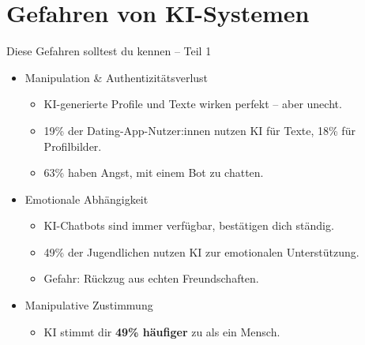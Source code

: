 \documentclass[10pt,aspectratio=169]{beamer}
\begin{document}
	\section{Gefahren von KI-Systemen}
	\begin{frame}{Diese Gefahren solltest du kennen – Teil 1}
		\begin{itemize}
			\item \alert{Manipulation \& Authentizitätsverlust}
			\begin{itemize}
				\item KI-generierte Profile und Texte wirken perfekt – aber unecht.
				\item 19\% der Dating-App-Nutzer:innen nutzen KI für Texte, 18\% für Profilbilder.\cite{Bitkom2025}
				\item 63\% haben Angst, mit einem Bot zu chatten.\cite{Bitkom2025}
			\end{itemize}
			\item \alert{Emotionale Abhängigkeit}
			\begin{itemize}
				\item KI-Chatbots sind immer verfügbar, bestätigen dich ständig.
				\item 49\% der Jugendlichen nutzen KI zur emotionalen Unterstützung.\cite{Crossroads2026}
				\item Gefahr: Rückzug aus echten Freundschaften.
			\end{itemize}
			\item \alert{Manipulative Zustimmung}
			\begin{itemize}
				\item KI stimmt dir \textbf{49\% häufiger} zu als ein Mensch.\cite{WienerZeitung2026}
			\end{itemize}
		\end{itemize}
	\end{frame}
	
\end{document}
